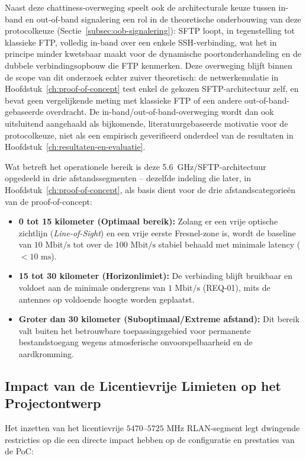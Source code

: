 Naast deze chattiness-overweging speelt ook de architecturale keuze tussen in-band en
out-of-band signalering een rol in de theoretische onderbouwing van deze protocolkeuze
(Sectie~\ref{subsec:oob-signalering}): SFTP loopt, in tegenstelling tot klassieke FTP,
volledig in-band over een enkele SSH-verbinding, wat het in principe minder kwetsbaar
maakt voor de dynamische poortonderhandeling en de dubbele verbindingsopbouw die FTP
kenmerken. Deze overweging blijft binnen de scope van dit onderzoek echter zuiver
theoretisch: de netwerkemulatie in Hoofdstuk~\ref{ch:proof-of-concept} test enkel de
gekozen SFTP-architectuur zelf, en bevat geen vergelijkende meting met klassieke FTP of
een andere out-of-band-gebaseerde overdracht. De in-band/out-of-band-overweging wordt dan
ook uitsluitend aangehaald als bijkomende, literatuurgebaseerde motivatie voor de
protocolkeuze, niet als een empirisch geverifieerd onderdeel van de resultaten in
Hoofdstuk~\ref{ch:resultaten-en-evaluatie}.

Wat betreft het operationele bereik is deze 5.6~GHz/SFTP-architectuur opgedeeld in drie afstandssegmenten -- dezelfde indeling die later, in Hoofdstuk~\ref{ch:proof-of-concept}, als basis dient voor de drie afstandscategorieën van de proof-of-concept:
\begin{itemize}
    \item \textbf{0 tot 15 kilometer (Optimaal bereik):} Zolang er een vrije optische zichtlijn (\textit{Line-of-Sight}) en een vrije eerste Fresnel-zone is, wordt de baseline van $10\text{ Mbit/s}$ tot over de $100\text{ Mbit/s}$ stabiel behaald met minimale latency ($<10\text{ ms}$).
    \item \textbf{15 tot 30 kilometer (Horizonlimiet):} De verbinding blijft bruikbaar en voldoet aan de minimale ondergrens van $1\text{ Mbit/s}$ (REQ-01), mits de antennes op voldoende hoogte worden geplaatst.
    \item \textbf{Groter dan 30 kilometer (Suboptimaal/Extreme afstand):} Dit bereik valt buiten het betrouwbare toepassingsgebied voor permanente bestandstoegang wegens atmosferische onvoorspelbaarheid en de aardkromming.
\end{itemize}

\subsection{Impact van de Licentievrije Limieten op het Projectontwerp}
\label{sec:req-impact-licentievrij}

Het inzetten van het licentievrije $5470\text{--}5725\text{ MHz}$ RLAN-segment legt dwingende restricties op die een directe impact hebben op de configuratie en prestaties van de PoC:

